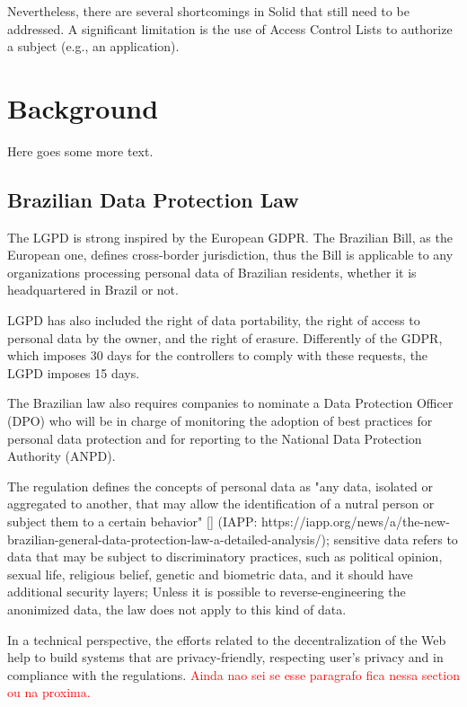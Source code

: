 \documentclass[sigconf]{acmart}
\begin{document}
Nevertheless, there are several shortcomings in Solid that still need to be addressed. A significant limitation is the use of Access Control Lists to authorize a subject (e.g., an application).








\section{Background}
Here goes some more text.

\subsection{Brazilian Data Protection Law}
The LGPD is strong inspired by the European GDPR. The Brazilian Bill, as the European one, defines cross-border jurisdiction, thus the Bill is applicable to any organizations processing personal data of Brazilian residents, whether it is headquartered in Brazil or not.

LGPD has also included the right of data portability, the right of access to personal data by the owner, and the right of erasure. Differently of the GDPR, which imposes 30 days for the controllers to comply with these requests, the LGPD imposes 15 days.

The Brazilian law also requires companies to nominate a Data Protection Officer (DPO) who will be in charge of monitoring the adoption of best practices for personal data protection and for reporting to the National Data Protection Authority (ANPD).

The regulation defines the concepts of personal data as "any data, isolated or aggregated to another, that may allow the identification of a nutral person or subject them to a certain behavior" [] (IAPP: https://iapp.org/news/a/the-new-brazilian-general-data-protection-law-a-detailed-analysis/); sensitive data refers to data that may be subject to discriminatory practices, such as political opinion, sexual life, religious belief, genetic and biometric data, and it should have additional security layers; Unless it is possible to reverse-engineering the anonimized data, the law does not apply to this kind of data.

In a technical perspective, the efforts related to the decentralization of the Web help to build systems that are privacy-friendly, respecting user's privacy and in compliance with the regulations.
\textcolor{red}{Ainda nao sei se esse paragrafo fica nessa section ou na proxima.}
\end{document}
